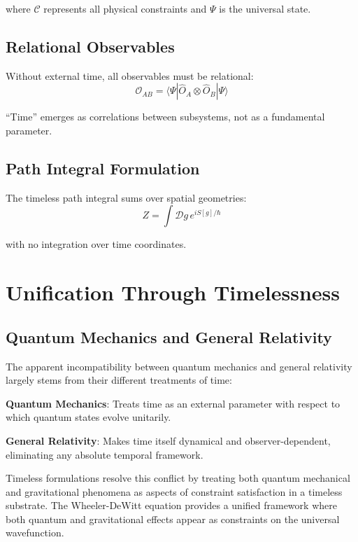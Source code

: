 \documentclass[12pt,a4paper]{article}
\begin{document}
where $\mathcal{C}$ represents all physical constraints and $\Psi$ is the universal state.

\subsection{Relational Observables}

Without external time, all observables must be relational:
\begin{equation}
\mathcal{O}_{AB} = \langle \Psi | \hat{O}_A \otimes \hat{O}_B | \Psi \rangle
\end{equation}

``Time'' emerges as correlations between subsystems, not as a fundamental parameter.

\subsection{Path Integral Formulation}

The timeless path integral sums over spatial geometries:
\begin{equation}
Z = \int \mathcal{D}g \, e^{iS[g]/\hbar}
\end{equation}

with no integration over time coordinates.

\section{Unification Through Timelessness}

\subsection{Quantum Mechanics and General Relativity}

The apparent incompatibility between quantum mechanics and general relativity largely stems from their different treatments of time:

\textbf{Quantum Mechanics}: Treats time as an external parameter with respect to which quantum states evolve unitarily.

\textbf{General Relativity}: Makes time itself dynamical and observer-dependent, eliminating any absolute temporal framework.

Timeless formulations resolve this conflict by treating both quantum mechanical and gravitational phenomena as aspects of constraint satisfaction in a timeless substrate. The Wheeler-DeWitt equation provides a unified framework where both quantum and gravitational effects appear as constraints on the universal wavefunction.
\end{document}
